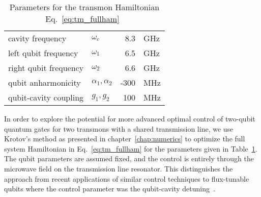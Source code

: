 \begin{table}[tb]
  \centering
  \begin{tabular}{llrl}
  \toprule
  cavity     frequency  &  $\omega_c$            & 8.3   &GHz \\
  left qubit frequency  &  $\omega_1$            & 6.5   &GHz \\
  right qubit frequency &  $\omega_2$            & 6.6   &GHz \\
  qubit anharmonicity   &  $\alpha_1, \alpha_2$  & -300  &MHz \\
  qubit-cavity coupling &  $g_1, g_2$            & 100   &MHz \\
  \bottomrule
  \end{tabular}
  \caption{Parameters for the transmon Hamiltonian
  Eq.~\eqref{eq:tm_fullham}~\cite{GirvinTransmonParams}
  }
  \label{tab:tm2013_params}
\end{table}

In order to explore the potential for more advanced optimal control of two-qubit
quantum gates for two transmons with a shared transmission line, we use Krotov's
method as presented in chapter~\ref{chap:numerics}
to optimize the full system Hamiltonian in Eq.~\eqref{eq:tm_fullham} for the
parameters given in Table~\ref{tab:tm2013_params}. The qubit parameters are
assumed fixed, and the control is entirely through the microwave field on the
transmission line resonator. This distinguishes the approach from recent
applications of similar control techniques to flux-tunable qubits where the
control parameter was the qubit-cavity detuning~\cite{EggerSST2014}.

